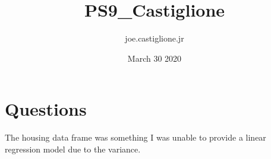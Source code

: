 \documentclass{article}
\title{PS9_Castiglione}
\author{joe.castiglione.jr }
\date{March 30 2020}
\begin{document}
\maketitle

\section{Questions}
The housing data frame was something I was unable to provide a linear regression model due to the variance. 
\end{document}
